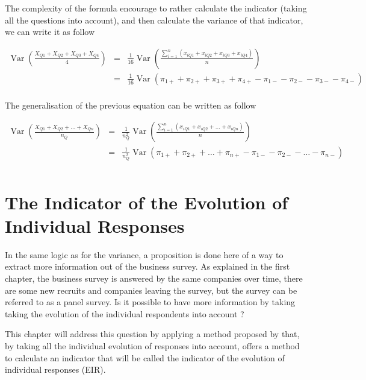 \documentclass[12pt,a4paper,oneside]{book}
\DeclareMathOperator{\Var}{Var}
\begin{document}
The complexity of the formula encourage to rather calculate the indicator (taking all the questions into account), and then calculate the variance of that indicator, we can write it as follow

\begin{eqnarray}
    \Var \left(\frac{X_{Q1} + X_{Q2} + X_{Q3} + X_{Q4}}{4} \right) 
    &=& \frac{1}{16} \Var \left(\frac{\sum_{i=1}^n \left(x_{i Q1} + x_{i Q2} + x_{i Q3} + x_{i Q4} \right)}{n} \right) \nonumber \\
    &=& \frac{1}{16} \Var \left(\pi_{1+} + \pi_{2+} + \pi_{3+} + \pi_{4+} - \pi_{1-} - \pi_{2-} - \pi_{3-} - \pi_{4-}  \right) \nonumber \\
\end{eqnarray}

The generalisation of the previous equation can be written as follow

\begin{eqnarray}
    \Var \left(\frac{X_{Q1} + X_{Q2} + \ldots + X_{Qn}}{n_Q} \right) 
    &=& \frac{1}{n_Q^2} \Var \left(\frac{\sum_{i=1}^n \left(x_{i Q1} + x_{i Q2} + ... + x_{i Qn} \right)}{n} \right) \nonumber \\
    &=& \frac{1}{n_Q^2} \Var \left(\pi_{1+} + \pi_{2+} + \ldots + \pi_{n+} - \pi_{1-} - \pi_{2-} - \ldots - \pi_{n-} \right) \nonumber \\
\end{eqnarray}

\chapter{The Indicator of the Evolution of Individual Responses}

In the same logic as for the variance, a proposition is done here of a way to extract more information out of the business survey. 
As explained in the first chapter, the business survey is answered by the same companies over time, there are some new recruits and companies leaving the survey, but the survey can be referred to as a panel survey.
Is it possible to have more information by taking taking the evolution of the individual respondents into account ? 

This chapter will address this question by applying a method proposed by \cite{caron_estimation_1996} that, by taking all the individual evolution of responses into account, offers a method to calculate an indicator that will be called the indicator of the evolution of individual responses (EIR).
\end{document}
